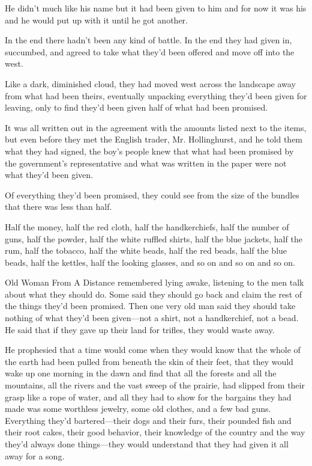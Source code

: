 \documentclass[10pt,a4paper,table]{article}
\begin{document}
\begin{excerptbox}
\noindent He didn’t much like his name but it had been given to him and for now it was his and he would put up with it until he got another.

In the end there hadn’t been any kind of battle. In the end they had given in, succumbed, and agreed to take what they’d been offered and move off into the west.

Like a dark, diminished cloud, they had moved west across the landscape away from what had been theirs, eventually unpacking everything they’d been given for leaving, only to find they’d been given half of what had been promised.

It was all written out in the agreement with the amounts listed next to the items, but even before they met the English trader, Mr. Hollinghurst, and he told them what they had signed, the boy’s people knew that what had been promised by the government’s representative and what was written in the paper were not what they’d been given.

Of everything they’d been promised, they could see from the size of the bundles that there was less than half.

Half the money, half the red cloth, half the handkerchiefs, half the number of guns, half the powder, half the white ruffled shirts, half the blue jackets, half the rum, half the tobacco, half the white beads, half the red beads, half the blue beads, half the kettles, half the looking glasses, and so on and so on and so on.

Old Woman From A Distance remembered lying awake, listening to the men talk about what they should do. Some said they should go back and claim the rest of the things they’d been promised. Then one very old man said they should take nothing of what they’d been given—not a shirt, not a handkerchief, not a bead. He said that if they gave up their land for trifles, they would waste away.

He prophesied that a time would come when they would know that the whole of the earth had been pulled from beneath the skin of their feet, that they would wake up one morning in the dawn and find that all the forests and all the mountains, all the rivers and the vast sweep of the prairie, had slipped from their grasp like a rope of water, and all they had to show for the bargains they had made was some worthless jewelry, some old clothes, and a few bad guns. Everything they’d bartered—their dogs and their furs, their pounded fish and their root cakes, their good behavior, their knowledge of the country and the way they’d always done things—they would understand that they had given it all away for a song.
\end{excerptbox}
\end{document}
